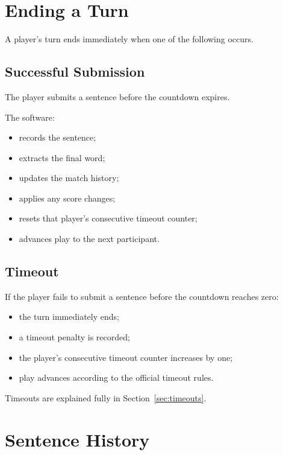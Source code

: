 \documentclass[11pt,a4paper]{article}
\begin{document}
\section{Ending a Turn}

A player's turn ends immediately when one of the following occurs.

\subsection*{Successful Submission}

The player submits a sentence before the countdown expires.

The software:

\begin{itemize}
    \item records the sentence;
    \item extracts the final word;
    \item updates the match history;
    \item applies any score changes;
    \item resets that player's consecutive timeout counter;
    \item advances play to the next participant.
\end{itemize}

\subsection*{Timeout}

If the player fails to submit a sentence before the countdown reaches zero:

\begin{itemize}
    \item the turn immediately ends;
    \item a timeout penalty is recorded;
    \item the player's consecutive timeout counter increases by one;
    \item play advances according to the official timeout rules.
\end{itemize}

Timeouts are explained fully in Section~\ref{sec:timeouts}.

\section{Sentence History}
\end{document}
